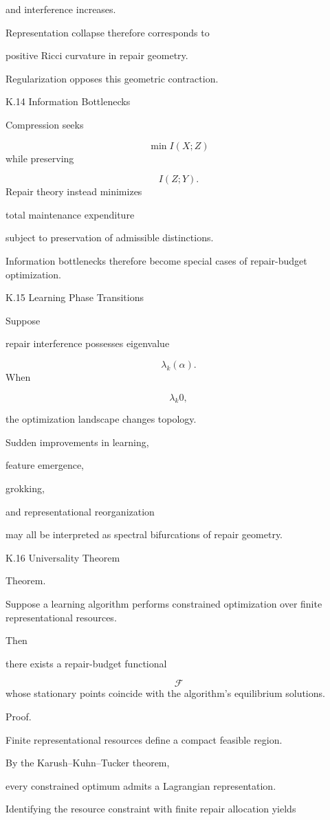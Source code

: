 \documentclass[12pt,oneside]{article}
\theoremstyle{plain}
\theoremstyle{definition}
\theoremstyle{remark}
\begin{document}
and interference increases.

Representation collapse therefore corresponds to

positive Ricci curvature in repair geometry.

Regularization opposes this geometric contraction.


K.14 Information Bottlenecks

Compression seeks

\[
\min
I(X;Z)
\]
while preserving

\[
I(Z;Y).
\]
Repair theory instead minimizes

total maintenance expenditure

subject to preservation of admissible distinctions.

Information bottlenecks therefore become special cases of repair-budget optimization.


K.15 Learning Phase Transitions

Suppose

repair interference possesses eigenvalue

\[
\lambda_k(\alpha).
\]
When

\[
\lambda_k
0,
\]

the optimization landscape changes topology.

Sudden improvements in learning,

feature emergence,

grokking,

and representational reorganization

may all be interpreted as spectral bifurcations of repair geometry.


K.16 Universality Theorem

Theorem.

Suppose a learning algorithm performs constrained optimization over finite representational resources.

Then

there exists a repair-budget functional

\[
\mathcal F
\]
whose stationary points coincide with the algorithm's equilibrium solutions.

Proof.

Finite representational resources define a compact feasible region.

By the Karush–Kuhn–Tucker theorem,

every constrained optimum admits a Lagrangian representation.

Identifying the resource constraint with finite repair allocation yields
\end{document}
